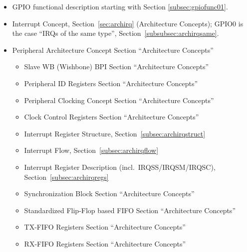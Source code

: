 \begin{itemize}
  \item GPIO functional description starting with Section \ref{subsec:gpiofunc01}.
  \item Interrupt Concept, Section~\ref{sec:archirq} (Architecture Concepts); GPIO0 is the case ``IRQs of the same type'', Section~\ref{subsubsec:archirqsame}.
  \item Peripheral Architecture Concept Section ``Architecture Concepts''
  \begin{itemize}
    \item Slave WB (Wishbone) BPI Section ``Architecture Concepts''
    \item Peripheral ID Registers Section ``Architecture Concepts''
    \item Peripheral Clocking Concept Section ``Architecture Concepts''
    \item Clock Control Registers Section ``Architecture Concepts''
    \item Interrupt Register Structure, Section~\ref{subsec:archirqstruct}
    \item Interrupt Flow, Section~\ref{subsec:archirqflow}
    \item Interrupt Register Description (incl.\ IRQSS/IRQSM/IRQSC), Section~\ref{subsec:archirqregs}
    \item Synchronization Block Section ``Architecture Concepts''
    \item Standardized Flip-Flop based FIFO Section ``Architecture Concepts''
    \item TX-FIFO Registers Section ``Architecture Concepts''
    \item RX-FIFO Registers Section ``Architecture Concepts''
  \end{itemize}
\end{itemize}
